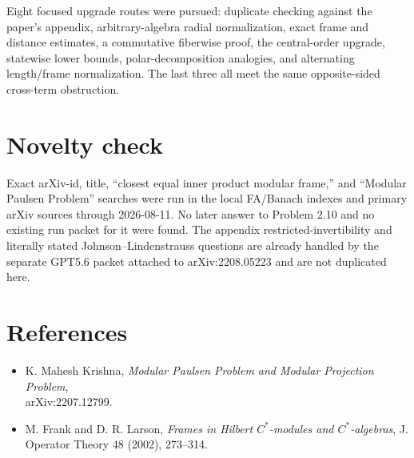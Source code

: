 \documentclass[11pt]{article}
\begin{document}
Eight focused upgrade routes were pursued: duplicate checking against the
paper's appendix, arbitrary-algebra radial normalization, exact frame and
distance estimates, a commutative fiberwise proof, the central-order
upgrade, statewise lower bounds, polar-decomposition analogies, and
alternating length/frame normalization.  The last three all meet the same
opposite-sided cross-term obstruction.

\section*{Novelty check}

Exact arXiv-id, title, ``closest equal inner product modular frame,'' and
``Modular Paulsen Problem'' searches were run in the local FA/Banach indexes
and primary arXiv sources through 2026-08-11.  No later answer to Problem
2.10 and no existing run packet for it were found.  The appendix
restricted-invertibility and literally stated Johnson--Lindenstrauss
questions are already handled by the separate GPT5.6 packet attached to
arXiv:2208.05223 and are not duplicated here.

\section*{References}

\begin{itemize}
\item K. Mahesh Krishna, \emph{Modular Paulsen Problem and Modular
Projection Problem},\\ arXiv:2207.12799.
\item M. Frank and D. R. Larson, \emph{Frames in Hilbert $C^*$-modules and
$C^*$-algebras}, J. Operator Theory 48 (2002), 273--314.
\end{itemize}
\end{document}
